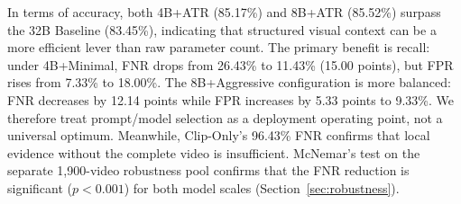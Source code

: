 \begin{table}[t]
  \small
  \centering
  \caption{Main results on UCF-Crime standard test set ($N$=290). \textbf{Bold}: best per
  method group. $\uparrow$/$\downarrow$: higher/lower is better.}
  \label{tab:main}
\end{table}

In terms of accuracy, both 4B+ATR (85.17\%) and 8B+ATR (85.52\%) surpass the 32B Baseline (83.45\%), indicating that structured visual context can be a more efficient lever than raw parameter count. The primary benefit is recall: under 4B+Minimal, FNR drops from 26.43\% to 11.43\% (15.00 points), but FPR rises from 7.33\% to 18.00\%. The 8B+Aggressive configuration is more balanced: FNR decreases by 12.14 points while FPR increases by 5.33 points to 9.33\%. We therefore treat prompt/model selection as a deployment operating point, not a universal optimum. Meanwhile, Clip-Only's 96.43\% FNR confirms that local evidence without the complete video is insufficient. McNemar's test on the separate 1{,}900-video robustness pool confirms that the FNR reduction is significant ($p < 0.001$) for both model scales (Section~\ref{sec:robustness}).





